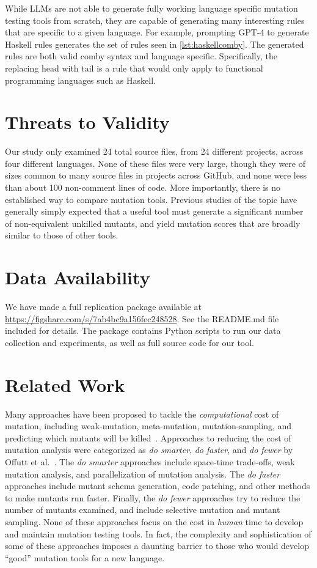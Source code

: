 \documentclass[acmsmall,screen,review,anonymous]{acmart}
\begin{document}
{While LLMs are not able to generate fully working language specific mutation testing tools from scratch, they are capable of generating many interesting rules
 that are specific to a given language. For example, prompting GPT-4 to generate Haskell rules generates the set of rules seen in \cref{lst:haskellcomby}. The generated rules are 
 both valid comby syntax and language specific. Specifically, the replacing head with tail is a rule that would only apply to functional programming languages such as 
 Haskell.

\section{Threats to Validity}

Our study only examined 24 total source files, from 24 different projects, across four different
languages.  None of these files were very large, though they were of
sizes common to many source files in projects across GitHub, and none
were less than about 100 non-comment lines of code.  More importantly,
there is no established way to compare mutation tools.
Previous studies of the topic have generally simply expected that a
useful tool must
generate a significant number of non-equivalent unkilled mutants, and
yield mutation scores that are broadly similar to those of other tools.

\section{Data Availability}

We have made a full replication package available at
\url{https://figshare.com/s/7ab4bc9a156fec248528}.  See the README.md
file included for details.  The package contains Python scripts to run
our data collection and experiments, as well as full source
code for our tool.

\section{Related Work}

Many approaches have been proposed to tackle the \emph{computational} cost of mutation, including weak-mutation, 
meta-mutation, mutation-sampling, and predicting which mutants will be
killed~\cite{offuttMutant1996,
  untch1993mutation,KaufmanFAKAJ2022,zhang2016pmt}.  Approaches to reducing the cost of
mutation analysis were categorized as \textit{do smarter}, \textit{do
faster}, and \textit{do fewer} by Offutt et al.~\cite{offutt2001mutation}.
The \textit{do smarter} approaches include space-time trade-offs, weak
mutation analysis, and parallelization of mutation analysis. The \textit{do
faster} approaches include mutant schema generation, code patching, and
other methods to make mutants run faster. Finally, the
\textit{do fewer} approaches try to reduce the number of mutants examined,
and include selective mutation and mutant sampling.
None of these approaches focus on the cost in \emph{human} time to
develop and maintain mutation testing tools.  In fact, the complexity
and sophistication of some of these approaches imposes a daunting
barrier to those who would develop ``good'' mutation tools for a new
language.

}
\end{document}
